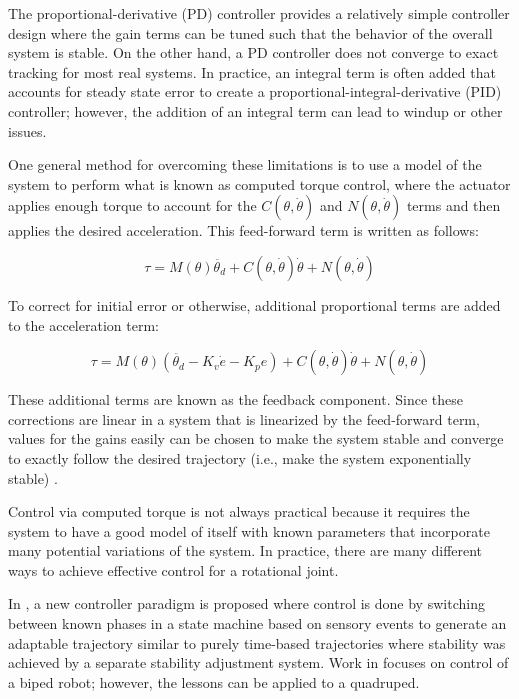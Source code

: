 The proportional-derivative (PD) controller provides a relatively simple controller design where the gain terms can be tuned such that the behavior of the overall system is stable. On the other hand, a PD controller does not converge to
exact tracking for most real systems. In practice, an integral term is often added that accounts for steady state error to create a proportional-integral-derivative (PID) controller; however, the addition of an integral term can lead to windup or other issues.

One general method for overcoming these limitations is to use a model of the 
system to perform what is known as computed torque control, where the actuator
applies enough torque to account for the $C(\theta, \dot{\theta})$ and
$N(\theta, \dot{\theta})$ terms and then applies the desired acceleration. This feed-forward term is written as follows:

\begin{equation}
\tau = M(\theta) \ddot{\theta_{d}} + C(\theta, \dot{\theta}) \dot{\theta} + N(\theta, \dot{\theta})
\end{equation}

To correct for initial error or otherwise, additional proportional terms are
added to the acceleration term:

\begin{equation}
\tau = M(\theta) (\ddot{\theta_{d}} - K_{v} \dot{e} - K_{p} e) + C(\theta, \dot{\theta}) \dot{\theta} + N(\theta, \dot{\theta})
\end{equation}

These additional terms are known as the feedback component. Since these 
corrections are linear in a system that is linearized by the feed-forward term,
values for the gains easily can be chosen to make the system stable and converge
to exactly follow the desired trajectory (i.e., make the system exponentially stable) \cite{MLS94}.

Control via computed torque 
is not always practical because it requires the system to have a good model of 
itself with known parameters that incorporate many potential variations of the
system. In practice, 
there are many different ways to achieve effective control for a rotational 
joint.


In \cite{EventBasedWalking}, a new controller paradigm is proposed where control
is done by switching between known phases in a state machine based on sensory
events to generate an adaptable trajectory similar to purely time-based
trajectories where stability was achieved by a separate stability adjustment
system. Work in \cite{EventBasedWalking} focuses on control of a biped robot; however, the lessons can
be applied to a quadruped.

